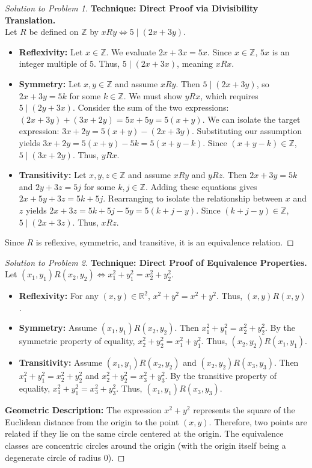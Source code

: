 \documentclass[11pt, a4paper]{article}
\theoremstyle{definition}
\theoremstyle{remark}
\newcommand{\R}{\mathbb{R}}
\newcommand{\Z}{\mathbb{Z}}
\begin{document}
\begin{proof}[Solution to Problem 1]
    \textbf{Technique: Direct Proof via Divisibility Translation.} \\
    Let $R$ be defined on $\Z$ by $xRy \iff 5 \mid (2x + 3y)$.
    \begin{itemize}
        \item \textbf{Reflexivity:} Let $x \in \Z$. We evaluate $2x + 3x = 5x$. Since $x \in \Z$, $5x$ is an integer multiple of $5$. Thus, $5 \mid (2x + 3x)$, meaning $xRx$.
        \item \textbf{Symmetry:} Let $x, y \in \Z$ and assume $xRy$. Then $5 \mid (2x + 3y)$, so $2x + 3y = 5k$ for some $k \in \Z$. We must show $yRx$, which requires $5 \mid (2y + 3x)$. Consider the sum of the two expressions: $(2x + 3y) + (3x + 2y) = 5x + 5y = 5(x + y)$. We can isolate the target expression: $3x + 2y = 5(x + y) - (2x + 3y)$. Substituting our assumption yields $3x + 2y = 5(x + y) - 5k = 5(x + y - k)$. Since $(x + y - k) \in \Z$, $5 \mid (3x + 2y)$. Thus, $yRx$.
        \item \textbf{Transitivity:} Let $x, y, z \in \Z$ and assume $xRy$ and $yRz$. Then $2x + 3y = 5k$ and $2y + 3z = 5j$ for some $k, j \in \Z$. Adding these equations gives $2x + 5y + 3z = 5k + 5j$. Rearranging to isolate the relationship between $x$ and $z$ yields $2x + 3z = 5k + 5j - 5y = 5(k + j - y)$. Since $(k + j - y) \in \Z$, $5 \mid (2x + 3z)$. Thus, $xRz$.
    \end{itemize}
    Since $R$ is reflexive, symmetric, and transitive, it is an equivalence relation.
\end{proof}

\begin{proof}[Solution to Problem 2]
    \textbf{Technique: Direct Proof of Equivalence Properties.} \\
    Let $(x_1, y_1) R (x_2, y_2) \iff x_1^2 + y_1^2 = x_2^2 + y_2^2$.
    \begin{itemize}
        \item \textbf{Reflexivity:} For any $(x, y) \in \R^2$, $x^2 + y^2 = x^2 + y^2$. Thus, $(x, y) R (x, y)$.
        \item \textbf{Symmetry:} Assume $(x_1, y_1) R (x_2, y_2)$. Then $x_1^2 + y_1^2 = x_2^2 + y_2^2$. By the symmetric property of equality, $x_2^2 + y_2^2 = x_1^2 + y_1^2$. Thus, $(x_2, y_2) R (x_1, y_1)$.
        \item \textbf{Transitivity:} Assume $(x_1, y_1) R (x_2, y_2)$ and $(x_2, y_2) R (x_3, y_3)$. Then $x_1^2 + y_1^2 = x_2^2 + y_2^2$ and $x_2^2 + y_2^2 = x_3^2 + y_3^2$. By the transitive property of equality, $x_1^2 + y_1^2 = x_3^2 + y_3^2$. Thus, $(x_1, y_1) R (x_3, y_3)$.
    \end{itemize}
    \textbf{Geometric Description:} The expression $x^2 + y^2$ represents the square of the Euclidean distance from the origin to the point $(x, y)$. Therefore, two points are related if they lie on the same circle centered at the origin. The equivalence classes are concentric circles around the origin (with the origin itself being a degenerate circle of radius 0).
\end{proof}
\end{document}
